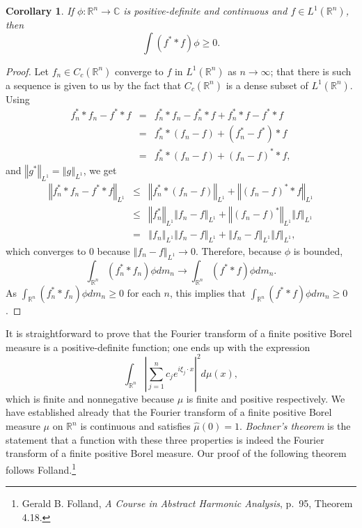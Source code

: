 \documentclass{article}
\newcommand{\norm}[1]{\left\Vert #1 \right\Vert}
\newtheorem{corollary}[theorem]{Corollary}
\theoremstyle{definition}
\begin{document}
\begin{corollary}
If $\phi:\mathbb{R}^n \to \mathbb{C}$ is positive-definite and continuous and $f \in L^1(\mathbb{R}^n)$, then
\[
\int (f^* * f) \phi \geq 0.
\]
\label{positivecor}
\end{corollary}
\begin{proof}
Let $f_n \in C_c(\mathbb{R}^n)$ converge to $f$ in $L^1(\mathbb{R}^n)$ as $n \to \infty$; that there is such a sequence is
given to us by the fact that $C_c(\mathbb{R}^n)$ is a dense subset of $L^1(\mathbb{R}^n)$. 
Using
\begin{eqnarray*}
f_n^* * f_n- f^* * f &=& f_n^* * f_n - f_n^** f + f_n^* *f - f^* * f\\
&=&f_n^**(f_n-f)+(f_n^*-f^*)*f\\
&=&f_n^**(f_n-f)+(f_n-f)^**f,
\end{eqnarray*}
and $\norm{g^*}_{L^1}=\norm{g}_{L^1}$,
we get
\begin{eqnarray*}
\norm{f_n^* * f_n - f^* * f}_{L^1}&\leq&\norm{f_n^**(f_n-f)}_{L^1}+\norm{(f_n-f)^**f}_{L^1}\\
&\leq&\norm{f_n^*}_{L^1} \norm{f_n-f}_{L^1} + \norm{(f_n-f)^*}_{L^1} \norm{f}_{L^1}\\
&=&\norm{f_n}_{L^1} \norm{f_n-f}_{L^1} + \norm{f_n-f}_{L^1} \norm{f}_{L^1},
\end{eqnarray*}
which converges to $0$ because $\norm{f_n-f}_{L^1} \to 0$. Therefore, because $\phi$ is bounded,
\[
\int_{\mathbb{R}^n} (f_n^* * f_n) \phi dm_n \to \int_{\mathbb{R}^n} (f^* * f)\phi dm_n.
\]
As $\int_{\mathbb{R}^n} (f_n^* * f_n)\phi dm_n \geq 0$ for each $n$, this implies that $\int_{\mathbb{R}^n} (f^* * f)\phi dm_n \geq 0$.
\end{proof}



It is straightforward to prove that the Fourier transform of a finite positive Borel measure is a positive-definite function; one ends up with the expression
\[
\int_{\mathbb{R}^n} \left| \sum_{j=1}^n c_j e^{i\xi_j\cdot x} \right|^2 d\mu(x),
\]
which is finite and nonnegative because $\mu$ is finite and positive respectively. We have established already that the
Fourier transform of a finite positive Borel measure $\mu$ on $\mathbb{R}^n$ is continuous and satisfies $\hat{\mu}(0)=1$. {\em Bochner's theorem}
is the statement that a function with these three properties is indeed the Fourier transform of a finite positive Borel measure.
Our proof of the following theorem follows Folland.\footnote{Gerald B. Folland, {\em A Course in Abstract Harmonic Analysis}, p.~95, Theorem 4.18.}
\end{document}
